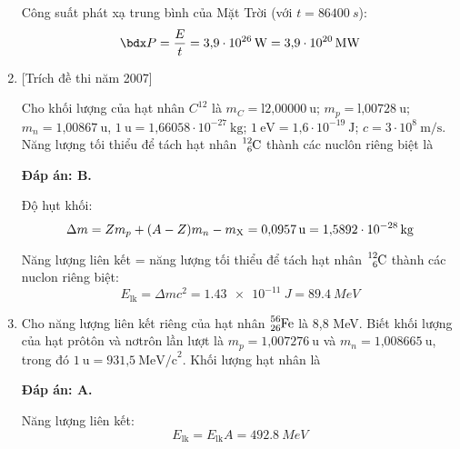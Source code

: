 \begin{enumerate}[label=\bfseries Câu \arabic*:]
{		Công suất phát xạ trung bình của Mặt Trời (với $t=\SI{86400}{s}$):
		$$\calP = \dfrac{E}{t} = \SI{3.9e26}{W} = \SI{3.9e20}{MW}$$
		
	}
	
	
	
	\item {} [Trích đề thi năm 2007]
	
	\cauhoi
	{Cho khối lượng của hạt nhân $C^{12}$ là  $m_C  = \text{l2,00000}\ \text{u}$; $m_p = \text{l,00728}\ \text{u}$; $m_n =\text{1,00867}\ \text{u}$, $1\ \text{u}=\text{1,66058}\cdot 10^{-27}\ \text{kg}$;  $1\ \text{eV}= \text{1,6}\cdot 10^{-19}\ \text{J}$; $c = 3\cdot 10^8\ \text{m/s}$. Năng lượng tối thiểu để tách hạt nhân $\ce{^12_6 C}$ thành các nuclôn riêng biệt là
	}
	
	\loigiai
	{		\textbf{Đáp án: B.}
		
		Độ hụt khối:
		$$\Delta m = Z m_p + (A-Z)m_n - m_{\ce{X}} = \SI{0.0957}{u} = \SI{1.5892e-28}{kg}$$
		
		Năng lượng liên kết = năng lượng tối thiểu để tách hạt nhân $\ce{^12_6 C}$ thành các nuclon riêng biệt:
		$$E_{\text{lk}} = \Delta m c^2 = \SI{1.43e-11}{J} = \SI{89.4}{MeV}$$
		
	}
	
	\item {}
	
	\cauhoi
	{Cho năng lượng liên kết riêng của hạt nhân $\ce{^{56}_{26} Fe}$ là 8,8 MeV. Biết khối lượng của hạt prôtôn và nơtrôn lần lượt là $m_p = \text{1,007276}\ \text{u}$ và $m_n = \text{1,008665}\ \text{u}$, trong đó $1\ \text{u} = \text{931,5}\ \text{MeV/c}^2$. Khối lượng hạt nhân  là
	}
	
	\loigiai
	{		\textbf{Đáp án: A.}
		
		Năng lượng liên kết:
		$$E_{\text{lk}} = E_{\text{lk}} A = \SI{492.8}{MeV}$$
		
}
\end{enumerate}
